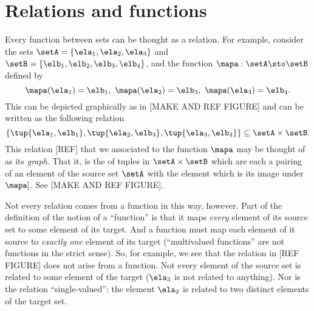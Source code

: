 

\section{Relations and functions}

Every function between sets can be thought as a relation. For example, consider the sets $\setA = \{ \ela_1, \ela_2, \ela_3 \}$ and $\setB = \{ \elb_1, \elb_2, \elb_3, \elb_4 \}$, and the function $\mapa : \setA \sto \setB$ defined by 
\begin{equation}
\mapa (\ela_1) = \elb_1, \ \mapa (\ela_2) = \elb_3, \ \mapa(\ela_3) = \elb_4.
\end{equation}
This can be depicted graphically as in [MAKE AND REF FIGURE] and can be written as the following relation
\begin{equation}
\{ \tup{\ela_1, \elb_1}, \tup{\ela_2, \elb_3}, \tup{\ela_3, \elb_4} \} \subseteq \setA \times \setB.
\end{equation}
This relation [REF] that we associated to the function $\mapa$ may be thought of as its \emph{graph}. That it, is the of tuples in $\setA \times \setB$ which are each a pairing of an element of the source set $\setA$ with the element which is its image under $\mapa]$. See [MAKE AND REF FIGURE]. 

Not every relation comes from a function in this way, however. Part of the definition of the notion of a ``function'' is that it maps \emph{every} element of its source set to some element of its target. And a function must map each element of it source to \emph{exactly one} element of its target (``multivalued functions'' are not functions in the strict sense). So, for example, we see that the relation in [REF FIGURE] does not arise from a function. Not every element of the source set is related to some element of the target ($\ela_3$ is not related to anything). Nor is the relation ``single-valued'': the element $\ela_2$ is related to two distinct elements of the target set.

